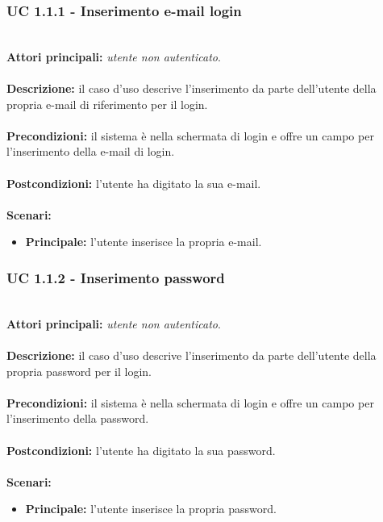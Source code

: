 \documentclass[a4paper,11pt]{article}
\begin{document}
\vspace{6 mm}

\subsubsection{UC 1.1.1 - Inserimento e-mail login}
\ \\
\textbf{Attori principali:} \textit{utente non autenticato}.\\
\\
\textbf{Descrizione:} il caso d'uso descrive l'inserimento da parte dell'utente della propria e-mail di riferimento per il login. \\
\\
\textbf{Precondizioni:} il sistema è nella schermata di login e offre un campo per l'inserimento della e-mail di login.\\
\\
\textbf{Postcondizioni:} l'utente ha digitato la sua e-mail. \\
\\
\textbf{Scenari:}
\begin{itemize}
\item \textbf{Principale:} l'utente inserisce la propria e-mail.
\end{itemize}

\vspace{6 mm}

\subsubsection{UC 1.1.2 - Inserimento password}
\ \\
\textbf{Attori principali:} \textit{utente non autenticato}.\\
\\
\textbf{Descrizione:} il caso d'uso descrive l'inserimento da parte dell'utente della propria password per il login. \\
\\
\textbf{Precondizioni:} il sistema è nella schermata di login e offre un campo per l'inserimento della password.\\
\\
\textbf{Postcondizioni:} l'utente ha digitato la sua password. \\
\\
\textbf{Scenari:}
\begin{itemize}
\item \textbf{Principale:} l'utente inserisce la propria password.
\end{itemize}
\end{document}
